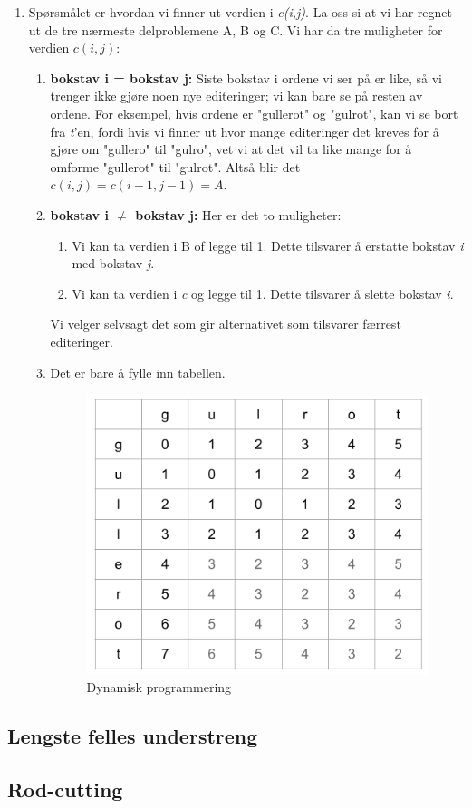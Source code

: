 \begin{boxed}
\begin{enumerate}
    \item Spørsmålet er hvordan vi finner ut verdien i \textit{c(i,j)}. La oss si at vi har regnet ut de tre nærmeste delproblemene A, B og C. Vi har da tre muligheter for verdien $c(i,j)$:
    \begin{enumerate}
        \item \textbf{bokstav i = bokstav j:} Siste bokstav i ordene vi ser på er like, så vi trenger ikke gjøre noen nye editeringer; vi kan bare se på resten av ordene. For eksempel, hvis ordene er "gullerot" og "gulrot", kan vi se bort fra \textit{t}'en, fordi hvis vi finner ut hvor mange editeringer det kreves for å gjøre om "gullero" til "gulro", vet vi at det vil ta like mange for å omforme "gullerot" til "gulrot". Altså blir det $c(i,j) = c(i - 1, j - 1) = A$.
        \item \textbf{bokstav i $\neq$ bokstav j:} Her er det to muligheter:
        \begin{enumerate}
            \item Vi kan ta verdien i B of legge til 1. Dette tilsvarer å erstatte bokstav \textit{i} med bokstav \textit{j}.
            \item Vi kan ta verdien i \textit{c} og legge til 1. Dette tilsvarer å slette bokstav \textit{i}.
        \end{enumerate}
        Vi velger selvsagt det som gir alternativet som tilsvarer færrest editeringer.
        \item Det er bare å fylle inn tabellen.
        \begin{figure}[H]
        \includegraphics[scale=0.45]{images/dp}
        \centering %
        \caption{Dynamisk programmering}
        \label{fig:dp}
        \end{figure}
        
    \end{enumerate}
\end{enumerate}

\end{boxed}

\subsection{Lengste felles understreng}
\subsection{Rod-cutting}
